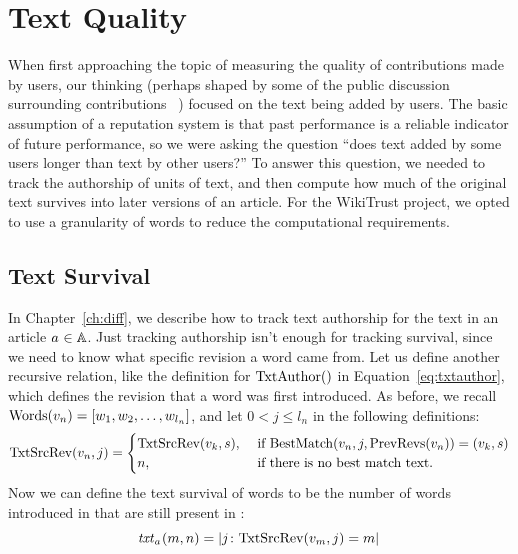 \section{Text Quality}
\label{sec:textquality}

When first approaching the topic of measuring the quality
of contributions made by users, our thinking (perhaps shaped
by some of the public discussion surrounding
contributions~\cite{Swartz2006} )
focused on the text being added by users.
The basic assumption of a reputation system is that past performance
is a reliable indicator of future performance, so we were
asking the question ``does text added by some users 
longer than text by other users?''
To answer this question, we needed to track the authorship of
units of text, and then compute how much of the original text
survives into later versions of an article.
For the WikiTrust project, we opted to use a granularity of words
to reduce the computational requirements.

\subsection{Text Survival}

In Chapter~\ref{ch:diff}, we describe how to track text authorship
for the text in an article $a_{} \in \mathbb{A}$.
Just tracking authorship isn't enough for tracking survival, since
we need to know what specific revision a word came from.
Let us define another recursive relation, like the definition
for $\mathrm{TxtAuthor}()$ in Equation~\ref{eq:txtauthor},
which defines the revision that a word was first introduced.
As before, we recall
$\mathrm{Words}(v_{n}) = \left[ w_1, w_2, \ldots, w_{l_n} \right]$, and let $0 < j \le l_n$ in the following definitions:
\begin{equation*}
\mathrm{TxtSrcRev}(v_{n}, j) =
    \begin{cases}
        \mathrm{TxtSrcRev}(v_{k}, s), & \text{ if }
        \mathrm{BestMatch}(v_{n}, j, \mathrm{PrevRevs}(v_{n})) = (v_{k}, s) \\
        n, & \text{ if there is no best match text. } \\
    \end{cases}
\end{equation*}
Now we can define the text survival of words to be the number of
words introduced in  that are still present in :
\begin{equation}
\mathit{txt}_{a_{}}(m,n) = \left| j \colon \mathrm{TxtSrcRev}(v_{m},j) = m \right| \\
\end{equation}

